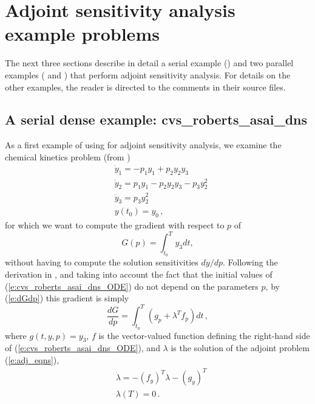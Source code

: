 \section{Adjoint sensitivity analysis example problems}\label{s:adj_examples}

The next three sections describe in detail a serial example
() and two parallel examples
( and )
that perform adjoint sensitivity analysis.  For details on the other
examples, the reader is directed to the comments in their source files.

\subsection{A serial dense example: cvs\_roberts\_asai\_dns}\label{ss:cvs_roberts_asai_dns}

As a first example of using {\cvodes} for adjoint sensitivity analysis,
we examine the chemical kinetics problem (from ) 
\begin{equation}\label{e:cvs_roberts_asai_dns_ODE}
  \begin{split}
    &{\dot y}_1 = -p_1 y_1 + p_2 y_2 y_3   \\
    &{\dot y}_2 =  p_1 y_1 - p_2 y_2 y_3 - p_3 y_2^2 \\
    &{\dot y}_3 =  p_3 y_2^2 \\
    &y(t_0) = y_0 \, ,
  \end{split}
\end{equation}
for which we want to compute the gradient with respect to $p$ of 
\begin{equation}\label{e:cvs_roberts_asai_dns_G}
  G(p) = \int_{t_0}^{T}  y_3  dt ,
\end{equation}
without having to compute the solution sensitivities ${dy}/{dp}$.
Following the derivation in , and taking into account
the fact that the initial values of (\ref{e:cvs_roberts_asai_dns_ODE}) do not depend on 
the parameters $p$, by (\ref{e:dGdp}) this gradient is simply
\begin{equation}\label{e:cvs_roberts_asai_dns_dGdp}
\frac{dG}{dp} = \int_{t_0}^{T} 
\left( g_p + \lambda^T f_p \right) dt \, ,
\end{equation}
where $g(t,y,p) = y_3$, $f$ is the vector-valued function 
defining the right-hand side of (\ref{e:cvs_roberts_asai_dns_ODE}), and $\lambda$ is 
the solution of the adjoint problem (\ref{e:adj_eqns}),
\begin{equation}\label{e:cvs_roberts_asai_dns_ADJ}
  \begin{split}
    &{\dot\lambda} = - (f_y)^T  \lambda - (g_y)^T \\
    &\lambda(T) = 0 \, .
  \end{split}
\end{equation}

